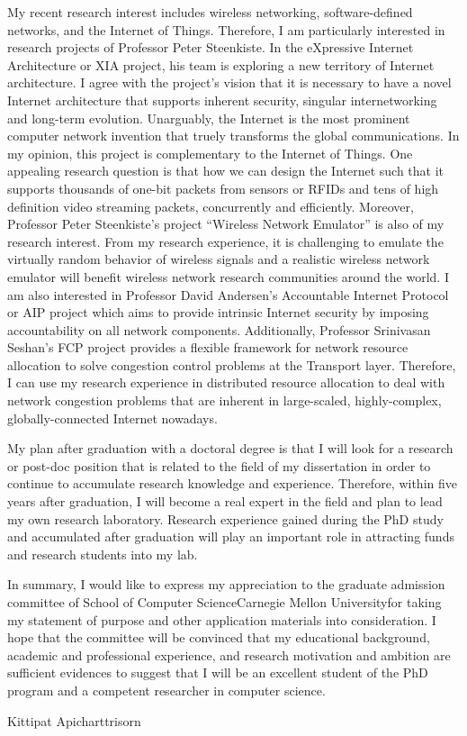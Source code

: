 \documentclass[10pt,a4paper,oneside]{report}
\newcommand{\university}{Carnegie Mellon University}
\newcommand{\department}{School of Computer Science}
\begin{document}
\vspace{0.2cm}
My recent research interest includes wireless networking, software-defined networks, and the Internet of Things. Therefore, I am particularly interested in research projects of Professor Peter Steenkiste. In the eXpressive Internet Architecture or XIA project, his team is exploring a new territory of Internet architecture. I agree with the project's vision that it is necessary to have a novel Internet architecture that supports inherent security, singular internetworking and long-term evolution. Unarguably, the Internet is the most prominent computer network invention that truely transforms the global communications. In my opinion, this project is complementary to the Internet of Things. One appealing research question is that how we can design the Internet such that it supports thousands of one-bit packets from sensors or RFIDs and tens of high definition video streaming packets, concurrently and efficiently. Moreover, Professor Peter Steenkiste's project ``Wireless Network Emulator'' is also of my research interest. From my research experience, it is challenging to emulate the virtually random behavior of wireless signals and a realistic wireless network emulator will benefit wireless network research communities around the world. I am also interested in Professor David Andersen's Accountable Internet Protocol or AIP project which aims to provide intrinsic Internet security by imposing accountability on all network components. Additionally, Professor Srinivasan Seshan's FCP project provides a flexible framework for network resource allocation to solve congestion control problems at the Transport layer. Therefore, I can use my research experience in distributed resource allocation to deal with network congestion problems that are inherent in large-scaled, highly-complex, globally-connected Internet nowadays.

\vspace{0.2cm}
My plan after graduation with a doctoral degree is that I will look for a research or post-doc position that is related to the field of my dissertation in order to continue to accumulate research knowledge and experience. Therefore, within five years after graduation, I will become a real expert in the field and plan to lead my own research laboratory. Research experience gained during the PhD study and accumulated after graduation will play an important role in attracting funds and research students into my lab.

\vspace{0.2cm}
In summary, I would like to express my appreciation to the graduate admission committee of \department \space \university \space for taking my statement of purpose and other application materials into consideration. I hope that the committee will be convinced that my educational background, academic and professional experience, and research motivation and ambition are sufficient evidences to suggest that I will be an excellent student of the PhD program and a competent researcher in computer science.

\vspace{1cm}
\raggedleft Kittipat Apicharttrisorn
\end{document}
